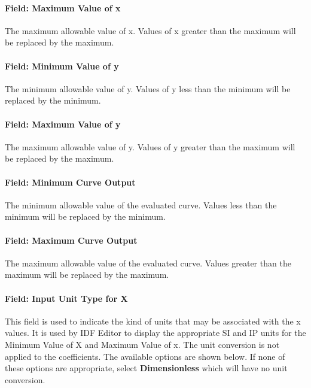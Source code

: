 \paragraph{Field: Maximum Value of x}\label{field-maximum-value-of-x-11}

The maximum allowable value of x. Values of x greater than the maximum will be replaced by the maximum.

\paragraph{Field: Minimum Value of y}\label{field-minimum-value-of-y-5}

The minimum allowable value of y. Values of y less than the minimum will be replaced by the minimum.

\paragraph{Field: Maximum Value of y}\label{field-maximum-value-of-y-5}

The maximum allowable value of y. Values of y greater than the maximum will be replaced by the maximum.

\paragraph{Field: Minimum Curve Output}\label{field-minimum-curve-output-9}

The minimum allowable value of the evaluated curve. Values less than the minimum will be replaced by the minimum.

\paragraph{Field: Maximum Curve Output}\label{field-maximum-curve-output-8}

The maximum allowable value of the evaluated curve. Values greater than the maximum will be replaced by the maximum.

\paragraph{Field: Input Unit Type for X}\label{field-input-unit-type-for-x-10}

This field is used to indicate the kind of units that may be associated with the x values. It is used by IDF Editor to display the appropriate SI and IP units for the Minimum Value of X and Maximum Value of x. The unit conversion is not applied to the coefficients. The available options are shown below. If none of these options are appropriate, select \textbf{Dimensionless} which will have no unit conversion.

